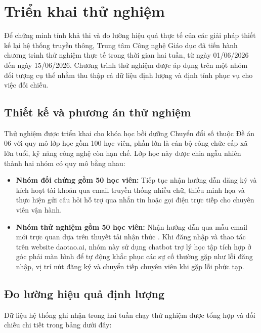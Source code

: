 \section{Triển khai thử nghiệm}

Để chứng minh tính khả thi và đo lường hiệu quả thực tế của các giải pháp thiết kế lại hệ thống truyền thông, Trung tâm Công nghệ Giáo dục đã tiến hành chương trình thử nghiệm thực tế trong thời gian hai tuần, từ ngày 01/06/2026 đến ngày 15/06/2026. Chương trình thử nghiệm được áp dụng trên một nhóm đối tượng cụ thể nhằm thu thập cả dữ liệu định lượng và định tính phục vụ cho việc đối chiếu.

\subsection{Thiết kế và phương án thử nghiệm}

Thử nghiệm được triển khai cho khóa học bồi dưỡng Chuyển đổi số thuộc Đề án 06 với quy mô lớp học gồm 100 học viên, phần lớn là cán bộ công chức cấp xã lớn tuổi, kỹ năng công nghệ còn hạn chế. Lớp học này được chia ngẫu nhiên thành hai nhóm có quy mô bằng nhau:
\begin{itemize}
    \item \textbf{Nhóm đối chứng gồm 50 học viên:} Tiếp tục nhận hướng dẫn đăng ký và kích hoạt tài khoản qua email truyền thống nhiều chữ, thiếu minh họa và thực hiện gửi câu hỏi hỗ trợ qua nhắn tin hoặc gọi điện trực tiếp cho chuyên viên vận hành.
    \item \textbf{Nhóm thử nghiệm gồm 50 học viên:} Nhận hướng dẫn qua mẫu email mới trực quan dựa trên thuyết tải nhận thức \parencite{sweller1988}. Khi đăng nhập và thao tác trên website daotao.ai, nhóm này sử dụng chatbot trợ lý học tập tích hợp ở góc phải màn hình để tự động khắc phục các sự cố thường gặp như lỗi đăng nhập, vị trí nút đăng ký và chuyển tiếp chuyên viên khi gặp lỗi phức tạp.
\end{itemize}

\subsection{Đo lường hiệu quả định lượng}

Dữ liệu hệ thống ghi nhận trong hai tuần chạy thử nghiệm được tổng hợp và đối chiếu chi tiết trong bảng dưới đây:

